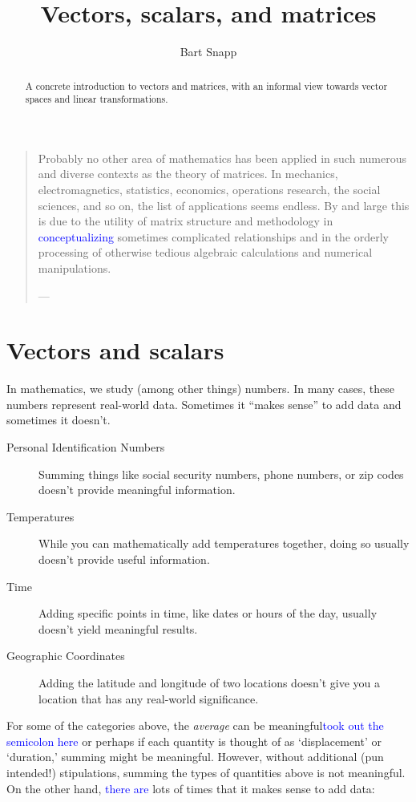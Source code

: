 \documentclass{ximera}
\author{Bart Snapp}
\title{Vectors, scalars, and matrices}
\begin{document}
\begin{abstract}
  A concrete introduction to vectors and matrices, with an informal
  view towards vector spaces and linear transformations.
\end{abstract}
\maketitle


\begin{quote}
  Probably no other area of mathematics has been applied in such
  numerous and diverse contexts as the theory of matrices. In
  mechanics, electromagnetics, statistics, economics, operations
  research, the social sciences, and so on, the list of applications
  seems endless. By and large this is due to the utility of matrix
  structure and methodology in \textcolor{blue}{conceptualizing} sometimes complicated
  relationships and in the orderly processing of otherwise tedious
  algebraic calculations and numerical manipulations.



  \hfill ---
\end{quote}


\section{Vectors and scalars}

In mathematics, we study (among other things) numbers. In many cases,
these numbers represent real-world data. Sometimes it ``makes sense''
to add data and sometimes it doesn't.
\begin{concept}
\begin{description}
\item[Personal Identification Numbers] Summing things like social
  security numbers, phone numbers, or zip codes doesn't provide
  meaningful information.
\item[Temperatures] While you can mathematically add temperatures
  together, doing so usually doesn't provide useful information.
\item[Time] Adding specific points in time, like dates or hours of the
  day, usually doesn't yield meaningful results.
\item[Geographic Coordinates] Adding the latitude and longitude of two
  locations doesn't give you a location that has any real-world
  significance.
\end{description}
\end{concept}
For some of the categories above, the \textit{average} can be
meaningful\textcolor{blue}{took out the semicolon here} or perhaps if each quantity is thought of as
`displacement' or `duration,' summing might be meaningful. However,
without additional (pun intended!) stipulations, summing the types of
quantities above is not meaningful. On the other hand, \textcolor{blue}{there are} lots of
times that it makes sense to add data:
\end{document}

